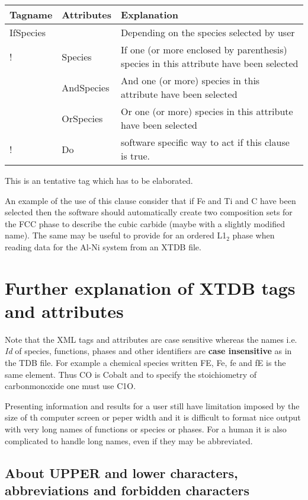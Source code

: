 \documentclass{article}
\begin{document}
\bigskip
\begin{tabular}{|p{} p{} p{}|}\hline
  Tagname& Attributes &  Explanation\\\hline

  IfSpecies & & Depending on the species selected by user\\
!      & Species & If one (or more enclosed by parenthesis) species
                  in this attribute have been selected\\
      & AndSpecies & And one (or more) species in this attribute have
                     been selected\\
      & OrSpecies & Or one (or more) species in this attribute have
                     been selected\\
!      & Do & software specific way to act if this clause is true.\\\hline
  
\end{tabular}

This is an tentative tag which has to be elaborated.

An example of the use of this clause consider that if Fe and Ti and C
have been selected then the software should automatically create two
composition sets for the FCC phase to describe the cubic carbide
(maybe with a slightly modified name).  The same may be useful to
provide for an ordered L1$_2$ phase when reading data for the Al-Ni
system from an XTDB file.

\section{Further explanation of XTDB tags and attributes}\label{sec:attributes}

Note that the XML tags and attributes are case sensitive whereas the
names i.e. {\em Id} of species, functions, phases and other identifiers
are {\bf case insensitive} as in the TDB file.  For example a chemical
species written FE, Fe, fe and fE is the same element.  Thus CO is
Cobalt and to specify the stoichiometry of carbonmonoxide one must use
C1O.

Presenting information and results for a user still have limitation
imposed by the size of th computer screen or peper width and it is
difficult to format nice output with very long names of functions or
species or phases.  For a human it is also complicated to handle long
names, even if they may be abbreviated.

\subsection{About UPPER and lower characters, abbreviations and forbidden characters}\label{sec:lettercase}
\end{document}
